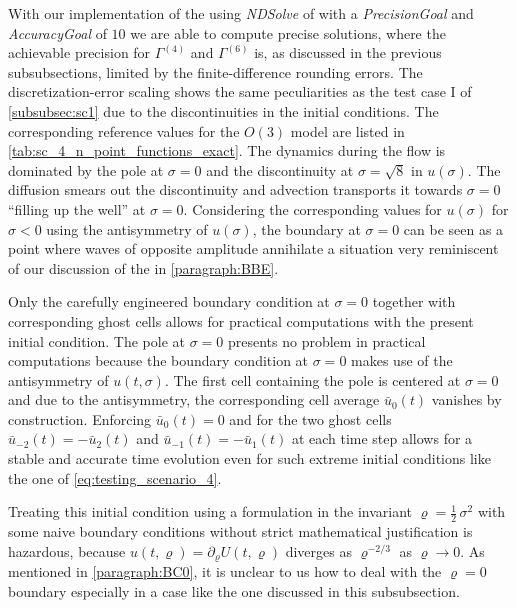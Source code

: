 With our implementation of the \ktScheme{} using \textit{NDSolve} of \WAMXIIwR{} with a \textit{PrecisionGoal} and \textit{AccuracyGoal} of $10$ we are able to compute precise solutions, where the achievable precision for $\Gamma^{(4)}$ and $\Gamma^{(6)}$ is, as discussed in the previous subsubsections, limited by the finite-difference rounding errors.
The discretization-error scaling shows the same peculiarities as the test case I of \cref{subsubsec:sc1} due to the discontinuities in the initial conditions.
The corresponding  reference values for the $O(3)$ model are listed in \cref{tab:sc_4_n_point_functions_exact}.
The dynamics during the \frg{} flow is dominated by the pole at $\sigma = 0$ and the discontinuity at $\sigma = \sqrt{8}$ in $u(\sigma)$.
The diffusion smears out the discontinuity and advection transports it towards $\sigma = 0$ ``filling up the well'' at $\sigma = 0$.
Considering the corresponding values for $u(\sigma)$ for $\sigma < 0$ using the antisymmetry of $u(\sigma)$, the boundary at $\sigma = 0$ can be seen as a point where waves of opposite amplitude annihilate \dash{} a situation very reminiscent of our discussion of the \bbeq{} in \cref{paragraph:BBE}.

Only the carefully engineered boundary condition at $\sigma = 0$ together with corresponding ghost cells allows for practical computations with the present initial condition.
The pole at $\sigma = 0$ presents no problem in practical computations because the boundary condition at $\sigma = 0$ makes use of the antisymmetry of $u ( t, \sigma )$. 
The first cell containing the pole is centered at $\sigma = 0$ and due to the antisymmetry, the corresponding cell average $\bar{u}_0(t)$ vanishes by construction.
Enforcing $\bar{u}_0(t)=0$ and for the two ghost cells $\bar{u}_{-2}(t)=-\bar{u}_{2}(t)$ and $\bar{u}_{-1}(t)=-\bar{u}_{1}(t)$ at each time step allows for a stable and accurate \frg{} time evolution even for such extreme initial conditions like the one of \cref{eq:testing_scenario_4}.

Treating this initial condition using a formulation in the invariant $\varrho = \tfrac{1}{2} \, \sigma^2$ with some naive boundary conditions without strict mathematical justification is hazardous, because $u ( t, \varrho ) = \partial_\varrho U ( t, \varrho )$ diverges as $\varrho^{-2/3}$ as $\varrho \rightarrow 0$.
As mentioned in \cref{paragraph:BC0}, it is unclear to us how to deal with the $\varrho = 0$ boundary especially in a case like the one discussed in this subsubsection.\bigskip

